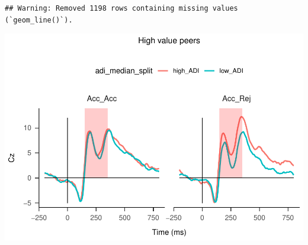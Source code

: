 \documentclass[
]{article}
\begin{document}
\begin{verbatim}
## Warning: Removed 1198 rows containing missing values (`geom_line()`).
\end{verbatim}

\includegraphics{do01_BUDS_files/figure-latex/unnamed-chunk-26-1.pdf}
\end{document}
